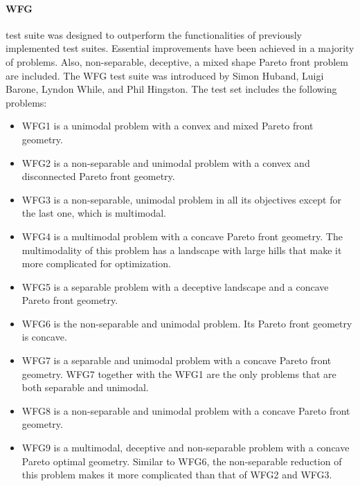         \paragraph{WFG}\cite{WFGref} test suite was designed to outperform the functionalities of previously implemented test suites. Essential improvements have been achieved in a majority of problems. Also, non-separable, deceptive, a mixed shape Pareto front problem are included. The WFG test suite was introduced by Simon Huband, Luigi Barone, Lyndon While, and Phil Hingston. 
        The test set includes the following problems:
        \begin{itemize}
            \item WFG1 is a unimodal problem with a convex and mixed Pareto front geometry. 
            \item WFG2 is a non-separable and unimodal problem with a convex and disconnected Pareto front geometry.
            \item WFG3 is a non-separable, unimodal problem in all its objectives except for the last one, which is multimodal.
            \item WFG4 is a multimodal problem with a concave Pareto front geometry. The multimodality of this problem has a landscape with large hills that make it more complicated for optimization.
            \item WFG5 is a separable problem with a deceptive landscape and a concave Pareto front geometry.
            \item WFG6 is the non-separable and unimodal problem. Its Pareto front geometry is concave. 
            \item WFG7 is a separable and unimodal problem with a concave Pareto front geometry. WFG7 together with the WFG1 are the only problems that are both separable and unimodal.
            \item WFG8 is a non-separable and unimodal problem with a concave Pareto front geometry.
            \item WFG9 is a multimodal, deceptive and non-separable problem with a concave Pareto optimal geometry. Similar to WFG6, the non-separable reduction of this problem makes it more complicated than that of WFG2 and WFG3.
        \end{itemize}



